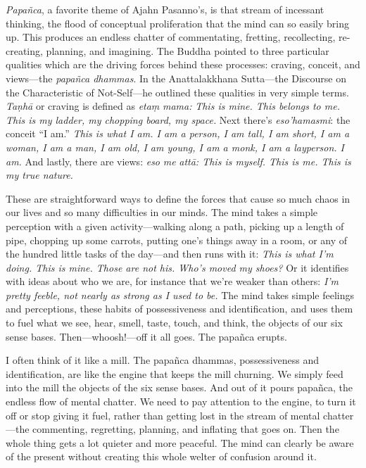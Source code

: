 
\emph{Papañca}, a favorite theme of Ajahn Pasanno's, is that stream of 
incessant thinking, the flood of conceptual proliferation that the mind 
can so easily bring up. This produces an endless chatter of 
commentating, fretting, recollecting, re-creating, planning, and 
imagining. The Buddha pointed to three particular qualities which are 
the driving forces behind these processes: craving, conceit, and 
views---the \emph{papañca dhammas}. In the Anattalakkhana Sutta---the 
Discourse on the Characteristic of Not-Self---he outlined these 
qualities in very simple terms. \emph{Taṇhā} or craving is defined 
as \emph{etaṃ} \emph{mama:} \emph{This is mine. This belongs to me. 
This is my ladder, my chopping board, my space.} Next there's 
\emph{eso'hamasmi}: the conceit ``I am.'' \emph{This is what I am. I am 
a person, I am tall, I am short, I am a woman, I am a man, I am old, I 
am young, I am a monk, I am a layperson. I am.} And lastly, there are 
views: \emph{eso} \emph{me} \emph{attā: This is myself. This is me. 
This is my true nature.}

These are straightforward ways to define the forces that cause so much 
chaos in our lives and so many difficulties in our minds. The mind 
takes a simple perception with a given activity---walking along a path, 
picking up a length of pipe, chopping up some carrots, putting one's 
things away in a room, or any of the hundred little tasks of the 
day---and then runs with it: \emph{This is what I'm doing. This is 
mine. Those are not his. Who's moved my shoes?} Or it identifies with 
ideas about who we are, for instance that we're weaker than others: 
\emph{I'm pretty feeble, not nearly as strong as I used to be.} The 
mind takes simple feelings and perceptions, these habits of 
possessiveness and identification, and uses them to fuel what we see, 
hear, smell, taste, touch, and think, the objects of our six sense 
bases. Then---whoosh!---off it all goes. The papañca erupts.

I often think of it like a mill. The papañca dhammas, possessiveness 
and identification, are like the engine that keeps the mill churning. 
We simply feed into the mill the objects of the six sense bases. And 
out of it pours papañca, the endless flow of mental chatter. We need 
to pay attention to the engine, to turn it off or stop giving it fuel, 
rather than getting lost in the stream of mental chatter---the 
commenting, regretting, planning, and inflating that goes on. Then the 
whole thing gets a lot quieter and more peaceful. The mind can clearly 
be aware of the present without creating this whole welter of confusion 
around it.

